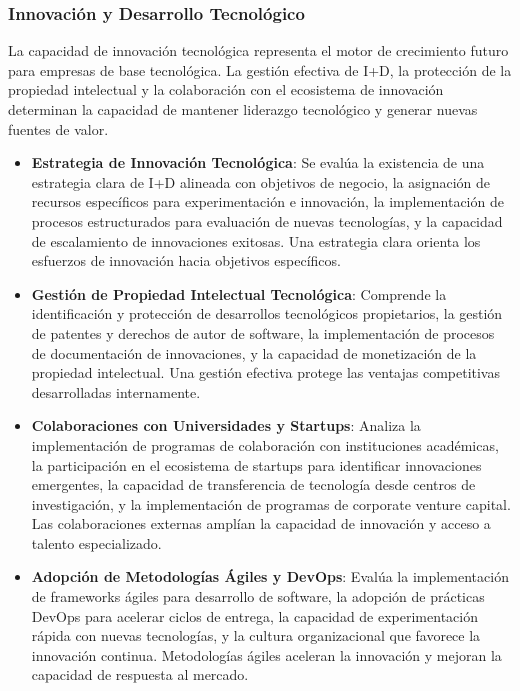 \subsubsection{Innovación y Desarrollo Tecnológico}

La capacidad de innovación tecnológica representa el motor de crecimiento futuro para empresas de base tecnológica. La gestión efectiva de I+D, la protección de la propiedad intelectual y la colaboración con el ecosistema de innovación determinan la capacidad de mantener liderazgo tecnológico y generar nuevas fuentes de valor.

\begin{itemize}
\item \textbf{Estrategia de Innovación Tecnológica}: Se evalúa la existencia de una estrategia clara de I+D alineada con objetivos de negocio, la asignación de recursos específicos para experimentación e innovación, la implementación de procesos estructurados para evaluación de nuevas tecnologías, y la capacidad de escalamiento de innovaciones exitosas. Una estrategia clara orienta los esfuerzos de innovación hacia objetivos específicos.

\item \textbf{Gestión de Propiedad Intelectual Tecnológica}: Comprende la identificación y protección de desarrollos tecnológicos propietarios, la gestión de patentes y derechos de autor de software, la implementación de procesos de documentación de innovaciones, y la capacidad de monetización de la propiedad intelectual. Una gestión efectiva protege las ventajas competitivas desarrolladas internamente.

\item \textbf{Colaboraciones con Universidades y Startups}: Analiza la implementación de programas de colaboración con instituciones académicas, la participación en el ecosistema de startups para identificar innovaciones emergentes, la capacidad de transferencia de tecnología desde centros de investigación, y la implementación de programas de corporate venture capital. Las colaboraciones externas amplían la capacidad de innovación y acceso a talento especializado.

\item \textbf{Adopción de Metodologías Ágiles y DevOps}: Evalúa la implementación de frameworks ágiles para desarrollo de software, la adopción de prácticas DevOps para acelerar ciclos de entrega, la capacidad de experimentación rápida con nuevas tecnologías, y la cultura organizacional que favorece la innovación continua. Metodologías ágiles aceleran la innovación y mejoran la capacidad de respuesta al mercado.
\end{itemize}

